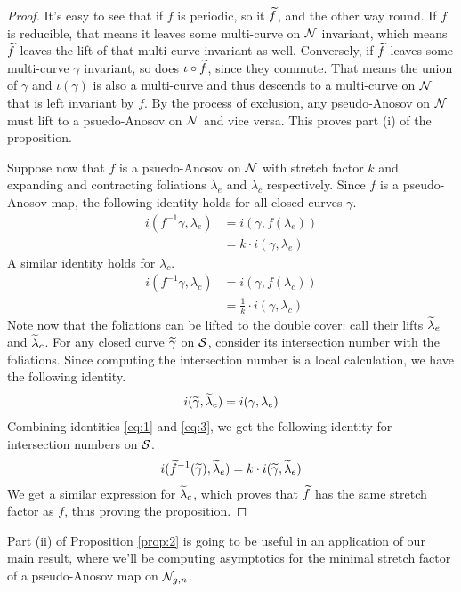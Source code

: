 \begin{proof}
  It's easy to see that if $f$ is periodic, so it $\widetilde{f}$, and the other way round. If $f$ is reducible, that means
  it leaves some multi-curve on $\mathcal{N}$ invariant, which means $\widetilde{f}$ leaves the lift of that multi-curve invariant as
  well. Conversely, if $\widetilde{f}$ leaves some multi-curve $\gamma$ invariant, so does $\iota \circ \widetilde{f}$, since they
  commute. That means the union of $\gamma$ and $\iota(\gamma)$ is also a multi-curve and thus descends
  to a multi-curve on $\mathcal{N}$ that is left invariant by $f$. By the process of exclusion, any pseudo-Anosov
  on $\mathcal{N}$ must lift to a psuedo-Anosov on $\mathcal{N}$ and vice versa. This proves part (i) of the proposition.

  Suppose now that $f$ is a psuedo-Anosov on $\mathcal{N}$ with stretch factor $k$ and expanding and contracting foliations
  $\lambda_e$ and $\lambda_c$ respectively. Since $f$ is a pseudo-Anosov map, the following identity holds
  for all closed curves $\gamma$.
  \begin{align}
    \label{eq:1}
    i(f^{-1}\gamma, \lambda_e) &= i(\gamma, f(\lambda_e)) \\
                               &= k \cdot i(\gamma, \lambda_e)
  \end{align}
  A similar identity holds for $\lambda_c$.
  \begin{align}
    \label{eq:2}
    i(f^{-1}\gamma, \lambda_c) &= i(\gamma, f(\lambda_c)) \\
                               &= \frac{1}{k} \cdot i(\gamma, \lambda_c)
  \end{align}
  Note now that the foliations can be lifted to the double cover: call their lifts $\widetilde{\lambda}_e$
  and $\widetilde{\lambda}_c$. For any closed curve $\widetilde{\gamma}$ on $\mathcal{S}$, consider its intersection number
  with the foliations. Since computing the intersection number is a local calculation, we have the following
  identity.
  \begin{align}
    \label{eq:3}
    i(\widetilde{\gamma}, \widetilde{\lambda}_e) = i(\gamma, \lambda_e)
  \end{align}
  Combining identities \eqref{eq:1} and \eqref{eq:3}, we get the following identity for intersection numbers
  on $\mathcal{S}$.
  \begin{align*}
    i(\widetilde{f}^{-1} (\widetilde{\gamma}), \widetilde{\lambda}_e) = k \cdot i(\widetilde{\gamma}, \widetilde{\lambda}_e)
  \end{align*}
  We get a similar expression for $\widetilde{\lambda}_c$, which proves that $\widetilde{f}$ has the same stretch factor
  as $f$, thus proving the proposition.
\end{proof}
Part (ii) of Proposition \ref{prop:2} is going to be useful in an application of our main result,
where we'll be computing asymptotics for the minimal stretch factor of a pseudo-Anosov map on
$\mathcal{N}_{g,n}$.

